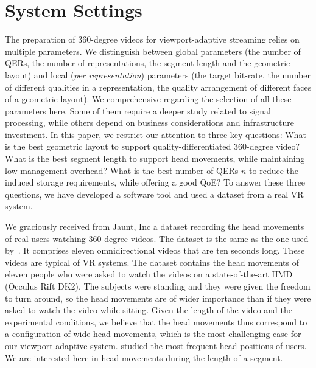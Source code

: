 \newcommand\testbitrateBudget{6}
\newcommand\testbitrateBudgetPercentage{\SI{75}{\percent}}
\section{System Settings}
\label{sec:settings}

The preparation of $360$-degree videos for viewport-adaptive streaming
relies on multiple parameters. We distinguish between global
parameters (the number of \acp{QER}, the number of
representations, the segment length and the geometric layout)
and local (\emph{per representation}) parameters (the target bit-rate,
the number of different qualities in a representation, the quality
arrangement of different faces of a geometric layout). We  comprehensive regarding the selection of all these
parameters here. Some of them require a deeper study related to signal
processing, while others depend on business
considerations and infrastructure investment. In this paper, we
restrict our attention to three key questions: What is the best
geometric layout to support quality-differentiated $360$-degree video?
What is the best segment length to support head movements, while
maintaining low management overhead? What is the best number of
\acp{QER} $n$ to reduce the induced storage requirements, while
offering a good \ac{QoE}? To answer these three questions, we have
developed a software tool and used a dataset from a real \ac{VR} system.


We graciously received from Jaunt, Inc a dataset
recording the head movements of real users watching $360$-degree videos.
The dataset is the same as the one used by~\citet{yu_framework_2015}. It comprises
eleven omnidirectional videos that are ten seconds long. These videos
are typical of \ac{VR} systems. The dataset contains
the head movements of eleven people who were asked to watch the videos
on a state-of-the-art \ac{HMD} (Occulus Rift DK2). The subjects were
standing and they were given the freedom to turn around, so the head
movements are of wider importance than if they were asked to watch the
video while sitting. Given the length of the video and the
experimental conditions, we believe that the head movements thus
correspond to a configuration of wide head movements, which
is the most challenging case for our viewport-adaptive
system. \citet{yu_framework_2015} studied the most frequent head
positions of users. We are interested here in head movements
during the length of a segment.

